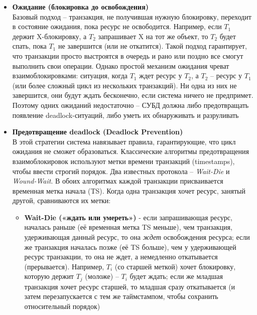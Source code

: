  \begin{itemize}
    \item \textbf{Ожидание (блокировка до освобождения)} ~\\
    Базовый подход – транзакция, не получившая нужную блокировку, переходит в состояние ожидания, пока ресурс не освободится. Например, если $T_1$ держит X-блокировку, а $T_2$ запрашивает X на тот же объект, то $T_2$ будет спать, пока $T_1$ не завершится (или не откатится). Такой подход гарантирует, что транзакции просто выстроятся в очередь и рано или поздно все смогут выполнить свои операции. Однако простой механизм ожидания чреват взаимоблокировками: ситуация, когда $T_1$ ждет ресурс у $T_2$, а $T_2$ – ресурс у $T_1$ (или более сложный цикл из нескольких транзакций). Ни одна из них не завершится, они будут ждать бесконечно, если система ничего не предпримет. Поэтому одних ожиданий недостаточно – СУБД должна либо предотвращать появление deadlock-ситуаций, либо уметь их обнаруживать и разруливать 
    \item \textbf{Предотвращение deadlock (Deadlock Prevention)} ~\\
    В этой стратегии система навязывает правила, гарантирующие, что цикл ожидания не сможет образоваться. Классические алгоритмы предотвращения взаимоблокировок используют метки времени транзакций (timestamps), чтобы ввести строгий порядок. Два известных протокола – \textit{Wait-Die} и \textit{Wound-Wait}. В обоих алгоритмах каждой транзакции присваивается временная метка начала (TS). Когда одна транзакция хочет ресурс, занятый другой, сравниваются их метки: 
    \begin{itemize}
        \item \textbf{Wait-Die («ждать или умереть»)} - если запрашивающая ресурс, началась раньше (её временная метка TS меньше), чем транзакция, удерживающая данный ресурс, то она \textit{ждет} освобождения ресурса; если же транзакция началась позже (её TS больше), чем у удерживающей ресурс транзакции, то она не ждет, а немедленно откатывается (прерывается). Например, $T_i$ (со старшей меткой) хочет блокировку, которую держит $T_j$ (моложе) – $T_i$ будет ждать; если же младшая транзакция хочет ресурс старшей, то младшая сразу откатывается (и затем перезапускается с тем же таймстампом, чтобы сохранить относительный порядок)

\end{itemize}
\end{itemize}

